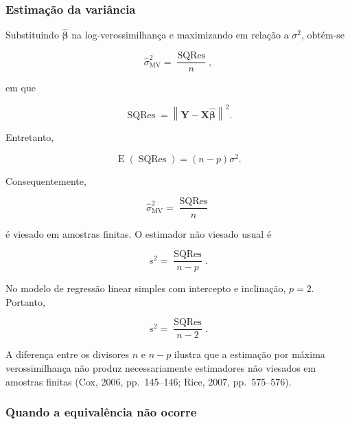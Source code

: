 \documentclass[
  letterpaper,
  DIV=11,
  numbers=noendperiod]{scrreprt}
\begin{document}
\subsubsection{Estimação da
variância}\label{estimauxe7uxe3o-da-variuxe2ncia}

Substituindo \(\widehat{\boldsymbol\beta}\) na log-verossimilhança e
maximizando em relação a \(\sigma^2\), obtém-se

\[\widehat{\sigma}_{\mathrm{MV}}^2
=
\frac{\operatorname{SQRes}}{n},\]

em que

\[\operatorname{SQRes}
=
\left\|
\mathbf{Y}
-
\mathbf{X}\widehat{\boldsymbol\beta}
\right\|^2.\]

Entretanto,

\[\operatorname{E}(\operatorname{SQRes})
=
(n-p)\sigma^2.\]

Consequentemente,

\[\widehat{\sigma}_{\mathrm{MV}}^2
=
\frac{\operatorname{SQRes}}{n}\]

é viesado em amostras finitas. O estimador não viesado usual é

\[s^2
=
\frac{\operatorname{SQRes}}{n-p}.\]

\begin{tcolorbox}[enhanced jigsaw, colback=white, leftrule=.75mm, colbacktitle=quarto-callout-note-color!10!white, breakable, titlerule=0mm, bottomtitle=1mm, title=\textcolor{quarto-callout-note-color}{\faInfo}\hspace{0.5em}{Observação}, colframe=quarto-callout-note-color-frame, toprule=.15mm, opacityback=0, bottomrule=.15mm, opacitybacktitle=0.6, arc=.35mm, toptitle=1mm, rightrule=.15mm, coltitle=black, left=2mm]

No modelo de regressão linear simples com intercepto e inclinação,
\(p=2\). Portanto,

\[s^2
=
\frac{\operatorname{SQRes}}{n-2}.\]

\end{tcolorbox}

A diferença entre os divisores \(n\) e \(n-p\) ilustra que a estimação
por máxima verossimilhança não produz necessariamente estimadores não
viesados em amostras finitas (Cox, 2006, pp.~145--146; Rice, 2007,
pp.~575--576).

\subsubsection{Quando a equivalência não
ocorre}\label{quando-a-equivaluxeancia-nuxe3o-ocorre}
\end{document}
